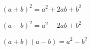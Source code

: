
\begin{tcolorbox}[title=Konjugat- och kvadreringsreglerna]
	$(a+b)^2=a^2+2ab+b^2$

	$(a-b)^2=a^2-2ab+b^2$

	$(a+b)(a-b)=a^2-b^2$
\end{tcolorbox}
